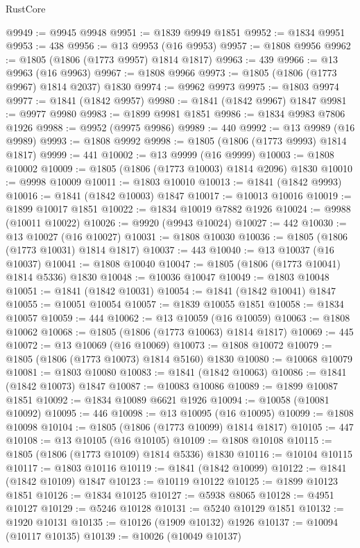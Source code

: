 \begin{lexlean}{RustCore}
\begin{coremodule}
@9949 := @9945 @9948
@9951 := @1839 @9949 @1851
@9952 := @1834 @9951
@9953 := 438
@9956 := @13 @9953 (@16 @9953)
@9957 := @1808 @9956
@9962 := @1805 (@1806 (@1773 @9957) @1814 @1817)
@9963 := 439
@9966 := @13 @9963 (@16 @9963)
@9967 := @1808 @9966
@9973 := @1805 (@1806 (@1773 @9967) @1814 @2037) @1830
@9974 := @9962 @9973
@9975 := @1803 @9974
@9977 := @1841 (@1842 @9957)
@9980 := @1841 (@1842 @9967) @1847
@9981 := @9977 @9980
@9983 := @1899 @9981 @1851
@9986 := @1834 @9983 @7806 @1926
@9988 := @9952 (@9975 @9986)
@9989 := 440
@9992 := @13 @9989 (@16 @9989)
@9993 := @1808 @9992
@9998 := @1805 (@1806 (@1773 @9993) @1814 @1817)
@9999 := 441
@10002 := @13 @9999 (@16 @9999)
@10003 := @1808 @10002
@10009 := @1805 (@1806 (@1773 @10003) @1814 @2096) @1830
@10010 := @9998 @10009
@10011 := @1803 @10010
@10013 := @1841 (@1842 @9993)
@10016 := @1841 (@1842 @10003) @1847
@10017 := @10013 @10016
@10019 := @1899 @10017 @1851
@10022 := @1834 @10019 @7882 @1926
@10024 := @9988 (@10011 @10022)
@10026 := @9920 (@9943 @10024)
@10027 := 442
@10030 := @13 @10027 (@16 @10027)
@10031 := @1808 @10030
@10036 := @1805 (@1806 (@1773 @10031) @1814 @1817)
@10037 := 443
@10040 := @13 @10037 (@16 @10037)
@10041 := @1808 @10040
@10047 := @1805 (@1806 (@1773 @10041) @1814 @5336) @1830
@10048 := @10036 @10047
@10049 := @1803 @10048
@10051 := @1841 (@1842 @10031)
@10054 := @1841 (@1842 @10041) @1847
@10055 := @10051 @10054
@10057 := @1839 @10055 @1851
@10058 := @1834 @10057
@10059 := 444
@10062 := @13 @10059 (@16 @10059)
@10063 := @1808 @10062
@10068 := @1805 (@1806 (@1773 @10063) @1814 @1817)
@10069 := 445
@10072 := @13 @10069 (@16 @10069)
@10073 := @1808 @10072
@10079 := @1805 (@1806 (@1773 @10073) @1814 @5160) @1830
@10080 := @10068 @10079
@10081 := @1803 @10080
@10083 := @1841 (@1842 @10063)
@10086 := @1841 (@1842 @10073) @1847
@10087 := @10083 @10086
@10089 := @1899 @10087 @1851
@10092 := @1834 @10089 @6621 @1926
@10094 := @10058 (@10081 @10092)
@10095 := 446
@10098 := @13 @10095 (@16 @10095)
@10099 := @1808 @10098
@10104 := @1805 (@1806 (@1773 @10099) @1814 @1817)
@10105 := 447
@10108 := @13 @10105 (@16 @10105)
@10109 := @1808 @10108
@10115 := @1805 (@1806 (@1773 @10109) @1814 @5336) @1830
@10116 := @10104 @10115
@10117 := @1803 @10116
@10119 := @1841 (@1842 @10099)
@10122 := @1841 (@1842 @10109) @1847
@10123 := @10119 @10122
@10125 := @1899 @10123 @1851
@10126 := @1834 @10125
@10127 := @5938 @8065
@10128 := @4951 @10127
@10129 := @5246 @10128
@10131 := @5240 @10129 @1851
@10132 := @1920 @10131
@10135 := @10126 (@1909 @10132) @1926
@10137 := @10094 (@10117 @10135)
@10139 := @10026 (@10049 @10137)

\end{coremodule}
\end{lexlean}

